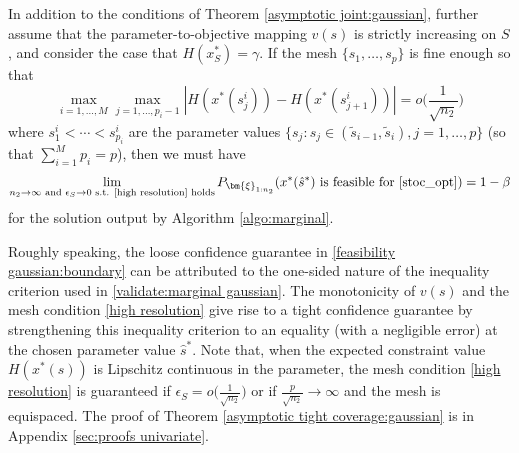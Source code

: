 \documentclass[mnsc,blindrev]{informs4} %
\newcommand{\abs}[1]{\left \vert #1 \right\vert}
\begin{document}
\begin{theorem}\label{asymptotic tight coverage:gaussian}
In addition to the conditions of Theorem \ref{asymptotic joint:gaussian}, further assume that the parameter-to-objective mapping $v(s)$ is strictly increasing on $S$, and consider the case that $H(x_S^*)=\gamma$. If the mesh $\{s_1,\ldots,s_p\}$ is fine enough so that \begin{equation}\label{high resolution}
    \max_{i=1,\ldots,M}\max_{j=1,\ldots,p_i-1}\abs{H(x^*(s^i_j))-H(x^*(s^i_{j+1}))}=o\big(\frac{1}{\sqrt{n_2}}\big)
\end{equation}
where $s^i_1<\cdots<s^i_{p_i}$ are the parameter values $\{s_j:s_j\in(\tilde s_{i-1},\tilde s_i),j=1,\ldots,p\}$ (so that $\sum_{i=1}^Mp_i=p$), then we must have $$\lim_{n_2\to\infty\text{ and }\epsilon_S\to 0\text{ s.t. \eqref{high resolution} holds}}P_{\bm{\xi}_{1:n_2}}(x^*(\hat{s}^*)\text{ is feasible for \eqref{stoc_opt}})= 1-\beta$$
for the solution output by Algorithm \ref{algo:marginal}.
\end{theorem}
Roughly speaking, the loose confidence guarantee in \eqref{feasibility gaussian:boundary} can be attributed to the one-sided nature of the inequality criterion used in \eqref{validate:marginal gaussian}. The monotonicity of $v(s)$ and the mesh condition \eqref{high resolution} give rise to a tight confidence guarantee by strengthening this inequality criterion to an equality (with a negligible error) at the chosen parameter value $\hat s^*$. Note that, when the expected constraint value $H(x^*(s))$ is Lipschitz continuous in the parameter, the mesh condition \eqref{high resolution} is guaranteed if $\epsilon_S=o\big(\frac{1}{\sqrt{n_2}}\big)$ or if $\frac{p}{\sqrt{n_2}}\to\infty$ and the mesh is equispaced. The proof of Theorem \ref{asymptotic tight coverage:gaussian} is in Appendix \ref{sec:proofs univariate}.
\end{document}
